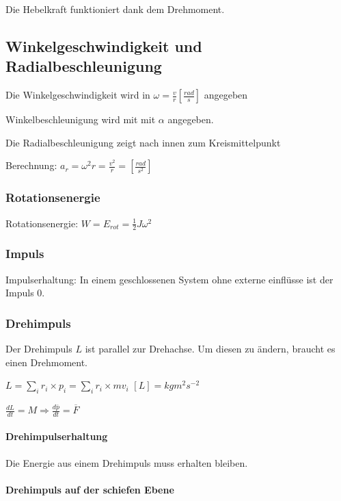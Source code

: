 \documentclass[a4paper]{scrartcl}
\begin{document}
	Die Hebelkraft funktioniert dank dem Drehmoment.

\subsection{Winkelgeschwindigkeit und Radialbeschleunigung}
	Die Winkelgeschwindigkeit wird in $\omega = \frac{v}{r}\left[ \frac{rad}{s} \right]$ angegeben
	
	Winkelbeschleunigung wird mit mit $\alpha$ angegeben.
	
	Die Radialbeschleunigung zeigt nach innen zum Kreismittelpunkt
	
	Berechnung: $a_r = \omega^2 r = \frac{v^2}{r} = \left[ \frac{rad}{s^2} \right]$

\subsubsection{Rotationsenergie}

	Rotationsenergie: $W = E_{rot} = \frac{1}{2} J \omega^2$
	
\subsubsection{Impuls}

Impulserhaltung: In einem geschlossenen System ohne externe einflüsse ist der Impuls 0. 
	
\subsubsection{Drehimpuls} %
	Der Drehimpuls $L$ ist parallel zur Drehachse. Um diesen zu ändern, braucht es einen Drehmoment.

	$L = \sum_i{r_i \times p_i} = \sum_i{r_i \times mv_i}$
	$\left[ L \right] = kg m^2 s^{-2}$
	
	$\frac{dL}{dt} = M \Rightarrow \frac{d\overline{p}}{dt} = \overline{F}$
	


	\paragraph{Drehimpulserhaltung}
	
	Die Energie aus einem Drehimpuls muss erhalten bleiben.
	
	
	\paragraph{Drehimpuls auf der schiefen Ebene} \hfill \\
	
\end{document}
